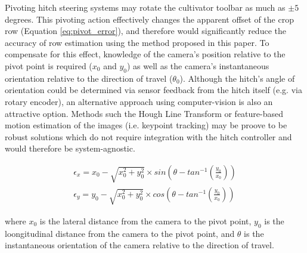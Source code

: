 \documentclass[authoryear]{elsarticle}
\begin{document}
Pivoting hitch steering systems may rotate the cultivator toolbar as
much as $\pm5$ degrees. This pivoting action effectively changes the
apparent offset of the crop row (Equation \ref{eq:pivot_error}), and
therefore would significantly reduce the accuracy of row estimation
using the method proposed in this paper. To compensate for this
effect, knowledge of the camera's position relative to the pivot point
is required ($x_0$ and $y_0$) as well as the camera's instantaneous
orientation relative to the direction of travel ($\theta_0$). Although
the hitch's angle of orientation could be determined via sensor
feedback from the hitch itself (e.g. via rotary encoder), an
alternative approach using computer-vision is also an attractive
option. Methods such the Hough Line Transform or feature-based motion
estimation of the images (i.e. keypoint tracking) may be proove to be
robust solutions which do not require integration with the hitch
controller and would therefore be system-agnostic.

\begin{equation}
  \begin{split}
  \epsilon_x = x_0 - \sqrt{x_0^2 + y_0^2} \times sin\left(\theta -
  tan^{-1}(\frac{y_0}{x_0})\right) \\
  \epsilon_y = y_0 - \sqrt{x_0^2 + y_0^2} \times cos\left(\theta -
  tan^{-1}(\frac{y_0}{x_0})\right)
  \end{split}
  \label{eq:pivot_error}
\end{equation}
\begin{flushleft}
where $x_0$ is the lateral distance from the camera to the pivot
point, $y_0$ is the loongitudinal distance from the camera to the pivot
point, and $\theta$ is the instantaneous orientation of the camera relative to the
direction of travel.
\end{flushleft}
\end{document}
